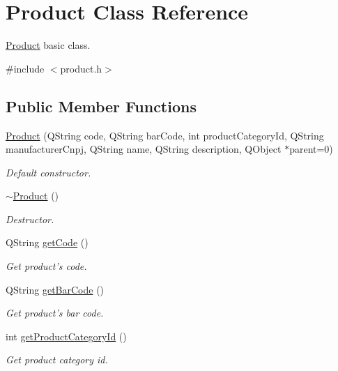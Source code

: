 \hypertarget{class_product}{\section{\-Product \-Class \-Reference}
\label{class_product}
}


\hyperlink{class_product}{\-Product} basic class.  




{\ttfamily \#include $<$product.\-h$>$}

\subsection*{\-Public \-Member \-Functions}
\begin{DoxyCompactItemize}
\item 
\hyperlink{class_product_a2a9dc152326008dca3327a7a9ac69345}{\-Product} (\-Q\-String code, \-Q\-String bar\-Code, int product\-Category\-Id, \-Q\-String manufacturer\-Cnpj, \-Q\-String name, \-Q\-String description, \-Q\-Object $\ast$parent=0)
\begin{DoxyCompactList}\small\item\em \-Default constructor. \end{DoxyCompactList}\item 
\hyperlink{class_product_abe0afd3bea96d979185ec2cfdf681e6f}{$\sim$\-Product} ()
\begin{DoxyCompactList}\small\item\em \-Destructor. \end{DoxyCompactList}\item 
\-Q\-String \hyperlink{class_product_a7f0a9e49f4140c9e01946eacab91dedc}{get\-Code} ()
\begin{DoxyCompactList}\small\item\em \-Get product's code. \end{DoxyCompactList}\item 
\-Q\-String \hyperlink{class_product_a427052c32a99a54f8137f48e802f9d4f}{get\-Bar\-Code} ()
\begin{DoxyCompactList}\small\item\em \-Get product's bar code. \end{DoxyCompactList}\item 
int \hyperlink{class_product_a9d66d2f9645d704416c8c5948672e3ec}{get\-Product\-Category\-Id} ()
\begin{DoxyCompactList}\small\item\em \-Get product category id. \end{DoxyCompactList}\item 

\end{DoxyCompactItemize}
